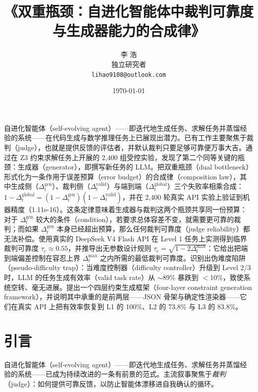 \documentclass{article}
\title{《双重瓶颈：自进化智能体中裁判可靠度与生成器能力的合成律》}
\author{李 浩\\[2pt]\small 独立研究者\\[2pt]\small \texttt{lihao9108@outlook.com}}
\date{\today}
\begin{document}
\maketitle

\begin{摘要}
自进化智能体（self-evolving agent）——即迭代地生成任务、求解任务并蒸馏经验的系统——在代码生成与数学推理任务上已展现出潜力。已有工作主要聚焦于裁判（judge），也就是提供反馈的评估者，并默认裁判只要足够可靠便万事大吉。通过在 Z3 约束求解任务上开展的 2,400 组受控实验，发现了第二个同等关键的瓶颈：生成器（generator），即撰写新任务的 LLM。把双重瓶颈（dual bottleneck）形式化为一条作用于误差预算（error budget）的合成律（composition law），其中生成侧（$\Delta_t^{\mathrm{gen}}$）、裁判侧（$\Delta_t^{\mathrm{valid}}$）与端到端（$\Delta_t^{\mathrm{global}}$）三个失败率相乘合成：$1 - \Delta_t^{\mathrm{global}} = (1 - \Delta_t^{\mathrm{gen}})(1 - \Delta_t^{\mathrm{valid}})$，并在 2,400 轮真实 API 实验上验证到机器精度（1.11e-16）。这条定律意味着生成器与裁判这两个瓶颈共享同一份预算：对于 $\Delta_t^{\mathrm{gen}}$ 较大的条件（condition），若要求总体容差不变，就需要更可靠的裁判；而如果 $\Delta_t^{\mathrm{gen}}$ 本身已经超出预算，那么任何裁判可靠度（judge reliability）都无法补偿。使用真实的 DeepSeek V4 Flash API 在 Level 1 任务上实测得到临界裁判可靠度 $\tau_c \approx 0.55$，并推导出无参数设计规则 $\tau_c = \sqrt{1-2\Delta_t^{\max}}$：它给出把端到端偏差控制在容忍上界 $\Delta_t^{\max}$ 之内所需的最低裁判可靠度。识别出伪难度陷阱（pseudo-difficulty trap）：当难度控制器（difficulty controller）升级到 Level 2/3 时，LLM 的任务生成有效率（valid task rate）从 $\sim$89\% 暴跌到 $<$10\%，致使系统空转、毫无进展。提出一个四层约束生成框架（four-layer constraint generation framework），并说明其中承重的是前两层——JSON 骨架与确定性渲染器——它们在真实 API 上把有效率恢复到 L1 的 100\%、L2 的 73.8\% 与 L3 的 83.8\%。
\end{摘要}

\section{引言}

自进化智能体（self-evolving agent）——即迭代地生成任务、求解任务并蒸馏经验的系统——已成为持续改进的一条有前景的范式。主流叙事聚焦于\textit{裁判}（judge）：如何提供可靠反馈，以防止智能体漂移进自我确认的循环。
\end{document}
